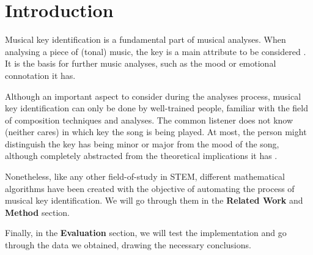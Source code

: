 \section{Introduction} \label{sec:intro}

Musical key identification is a fundamental part of musical analyses.
When analysing a piece of (tonal) music, the key is a main attribute to be considered \cite{temperley2004cognition}.
It is the basis for further music analyses, such as the mood or emotional connotation it has.

Although an important aspect to consider during the analyses process, musical key identification can only be done by well-trained people,
familiar with the field of composition techniques and analyses.
The common listener does not know (neither cares) in which key the song is being played.
At most, the person might distinguish the key has being minor or major from the mood of the song, although completely abstracted from the theoretical implications it has \cite{dparncutt}.

Nonetheless, like any other field-of-study in STEM, different mathematical algorithms have been created with the objective of automating the process of musical key identification.
We will go through them in the \textbf{Related Work} and \textbf{Method} section.

Finally, in the \textbf{Evaluation} section, we will test the implementation and go through the data we obtained, drawing the necessary conclusions.


